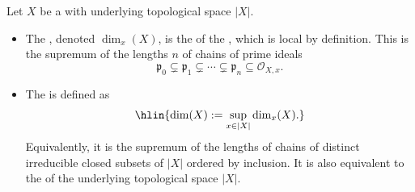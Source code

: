 \begin{definition} \label{definition:dimension_of_a_scheme}
Let $X$ be a  with underlying topological space $|X|$.
\begin{itemize}
    \item The , denoted $\dim_x(X)$, is the  of the  , which is local by definition. This is the supremum of the lengths $n$ of chains of prime ideals
    $$ \mathfrak{p}_0 \subsetneq \mathfrak{p}_1 \subsetneq \cdots \subsetneq \mathfrak{p}_n \subseteq \mathcal{O}_{X,x}.  $$

    \item The  is defined as
    $$ \hlin{\dim(X) := \sup_{x \in |X|} \dim_x(X). }$$
    Equivalently, it is the supremum of the lengths of chains of distinct irreducible closed subsets of $|X|$ ordered by inclusion. It is also equivalent to the  of the underlying topological space $|X|$.
\end{itemize}
\end{definition}